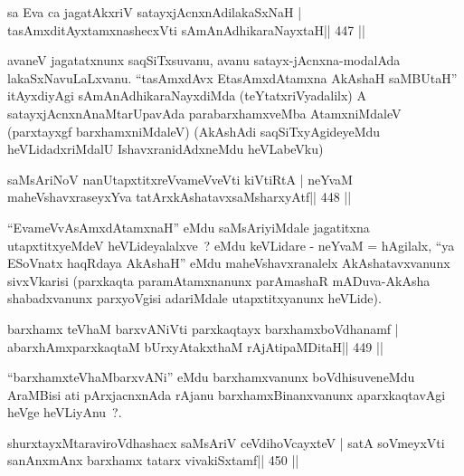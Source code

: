 \begin{shl}
sa Eva ca jagatAkxriV satayxjAcnxnAdilakaSxNaH |
tasAmxditAyxtamxnashecxVti sAmAnAdhikaraNayxtaH\hfill || 447 ||
\end{shl}

\begin{artha}
avaneV jagatatxnunx saqSiTxsuvanu, avanu satayx-jAcnxna-modalAda
lakaSxNavuLaLxvanu. ``tasAmxdAvx EtasAmxdAtamxna AkAshaH saMBUtaH''
itAyxdiyAgi sAmAnAdhikaraNayxdiMda (teYtatxriVyadalilx) A
satayxjAcnxnAnaMtarUpavAda parabarxhamxveMba AtamxniMdaleV (parxtayxgf
barxhamxniMdaleV) (AkAshAdi saqSiTxyAgideyeMdu heVLidadxriMdalU
IshavxranidAdxneMdu heVLabeVku)
\end{artha}




\begin{shl}
saMsAriNoV nanUtapxtitxreVvameVveVti kiVtiRtA |
neYvaM maheVshavxraseyxYva tatArx\s\s kAshatavxsaMsharxyAtf\hfill || 448 ||
\end{shl}

\begin{artha}
``EvameVvAsAmxdAtamxnaH'' eMdu saMsAriyiMdale jagatitxna   utapxtitxyeMdeV heVLideyalalxve~? eMdu keVLidare - neYvaM =   hAgilalx, ``ya ESoV\s natx haqRdaya AkAshaH'' eMdu   maheVshavxranalelx AkAshatavxvanunx sivxVkarisi (parxkaqta   paramAtamxnanunx parAmashaR mADuva-AkAsha shabadxvanunx parxyoVgisi   adariMdale utapxtitxyanunx heVLide).
\end{artha}



\begin{shl}
barxhamx teV\s haM barxvANiVti parxkaqtayx barxhamxboVdhanamf |
abarxhAmxparxkaqtaM bUrxyAtakxthaM rAjA\s tipaMDitaH\hfill || 449 ||
\end{shl}

\begin{artha}
``barxhamxteV\s haMbarxvANi'' eMdu barxhamxvanunx boVdhisuveneMdu   AraMBisi ati pArxjacnxnAda rAjanu barxhamxBinanxvanunx   aparxkaqtavAgi heVge heVLiyAnu~?.
\end{artha}

\begin{shl}
shurxtayxMtaraviroVdhashacx saMsAriV ceVdihoVcayxteV |
satA soVmeyxVti sanAnxmAnx barxhamx tatarx vivakiSxtamf\hfill || 450 ||
\end{shl}

